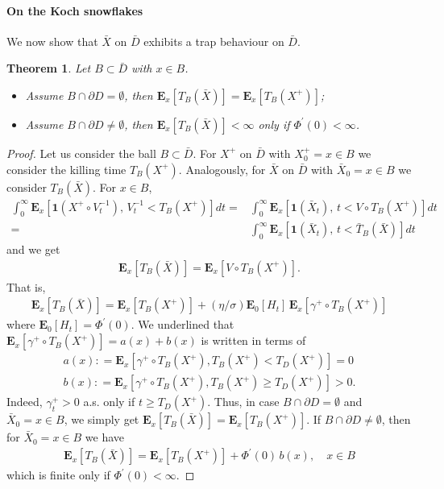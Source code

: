 \documentclass[[11pt,a4paper,reqno]{article}
\newtheorem{theorem}{Theorem}[section]
\numberwithin{equation}{section}
\begin{document}
\paragraph{On the Koch snowflakes}

We now show that $\bar{X}$  on $\bar{D}$ exhibits a trap behaviour on $\bar{D}$.

\begin{theorem}
Let $B \subset \bar{D}$ with $x \in B$.
\begin{itemize}
\item[i)] Assume $B \cap \partial D = \emptyset$, then $\mathbf{E}_x[T_B(\bar{X})] = \mathbf{E}_x[T_B(X^+)]$;
\item[ii)] Assume $B \cap \partial D \neq \emptyset$, then $\mathbf{E}_x[T_B(\bar{X})] < \infty$ only if $\Phi^\prime(0)< \infty$.
\end{itemize}
\label{thm:TrapBehBarX}
\end{theorem}
\begin{proof}
Let us consider the ball $B \subset \bar{D}$. For $X^+$ on $\bar{D}$ with $X^+_0=x \in B$ we consider the killing time $T_B(X^+)$. Analogously, for $\bar{X}$ on $\bar{D}$ with $\bar{X}_0 =x \in B$ we consider $T_B(\bar{X})$. For $x \in B$,
\begin{align*}
\int_0^\infty \mathbf{E}_x[\mathbf{1}(X^+ \circ V^{-1}_t),\, V^{-1}_t < T_B(X^+)] dt = & \int_0^\infty \mathbf{E}_x[\mathbf{1}(\bar{X}_t),\, t< V \circ T_B(X^+)] dt \\ 
= & \int_0^\infty \mathbf{E}_x[\mathbf{1}(\bar{X}_t),\, t < \bar{T}_B(\bar{X})] dt
\end{align*}
and we get
\begin{align*}
\mathbf{E}_x[T_B(\bar{X})] = \mathbf{E}_x[V \circ T_B(X^+)].
\end{align*}
That is, 
\begin{align*}
\mathbf{E}_x[T_B(\bar{X})] = \mathbf{E}_x[T_B(X^+)] + (\eta/\sigma) \mathbf{E}_0[H_t]\, \mathbf{E}_x[\gamma^+ \circ T_B(X^+)]
\end{align*}
where $\mathbf{E}_0[H_t] = \Phi^\prime (0)$. We underlined that $\mathbf{E}_x[\gamma^+ \circ T_B(X^+)] = a(x) + b(x)$ is written in terms of
\begin{align*}
a(x) : = \mathbf{E}_x[\gamma^+ \circ T_B(X^+), T_B(X^+) < T_{D}(X^+)] = 0\\
b(x) : = \mathbf{E}_x[\gamma^+ \circ T_B(X^+), T_B(X^+) \geq T_{D}(X^+)] >0.
\end{align*}
Indeed, $\gamma^+_t >0$ a.s. only if $t \geq T_{D}(X^+)$. Thus, in case $B \cap \partial D = \emptyset$ and $\bar{X}_0=x \in B$, we simply get $\mathbf{E}_x[T_B(\bar{X})]= \mathbf{E}_x[T_B(X^+)]$. If $B \cap \partial D \neq \emptyset$, then for $\bar{X}_0=x \in B$ we have 
\begin{align*}
\mathbf{E}_x[T_B(\bar{X})] = \mathbf{E}_x[T_B(X^+)] + \Phi^\prime(0)\, b(x), \quad x \in B
\end{align*} 
which is finite only if $\Phi^\prime(0)< \infty$.

\end{proof}
\end{document}
